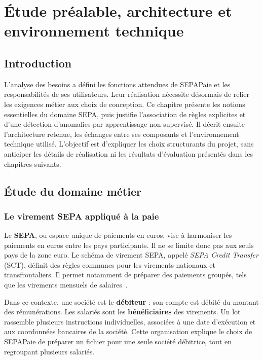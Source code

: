 \chapter{Étude préalable, architecture et environnement technique}
\label{ch:architecture}
\startcontents[chapters]
\chapterplan

\section{Introduction}

L'analyse des besoins a défini les fonctions attendues de SEPAPaie et les responsabilités de ses utilisateurs. Leur réalisation nécessite désormais de relier les exigences métier aux choix de conception. Ce chapitre présente les notions essentielles du domaine SEPA, puis justifie l'association de règles explicites et d'une détection d'anomalies par apprentissage non supervisé. Il décrit ensuite l'architecture retenue, les échanges entre ses composants et l'environnement technique utilisé. L'objectif est d'expliquer les choix structurants du projet, sans anticiper les détails de réalisation ni les résultats d'évaluation présentés dans les chapitres suivants.

\section{Étude du domaine métier}

\subsection{Le virement SEPA appliqué à la paie}

Le \textbf{SEPA}, ou espace unique de paiements en euros, vise à harmoniser les paiements en euros entre les pays participants. Il ne se limite donc pas aux seuls pays de la zone euro. Le schéma de virement SEPA, appelé \textit{SEPA Credit Transfer} (SCT), définit des règles communes pour les virements nationaux et transfrontaliers. Il permet notamment de préparer des paiements groupés, tels que les virements mensuels de salaires~\cite{epc-sct}.

Dans ce contexte, une société est le \textbf{débiteur} : son compte est débité du montant des rémunérations. Les salariés sont les \textbf{bénéficiaires} des virements. Un lot rassemble plusieurs instructions individuelles, associées à une date d'exécution et aux coordonnées bancaires de la société. Cette organisation explique le choix de SEPAPaie de préparer un fichier pour une seule société débitrice, tout en regroupant plusieurs salariés.

